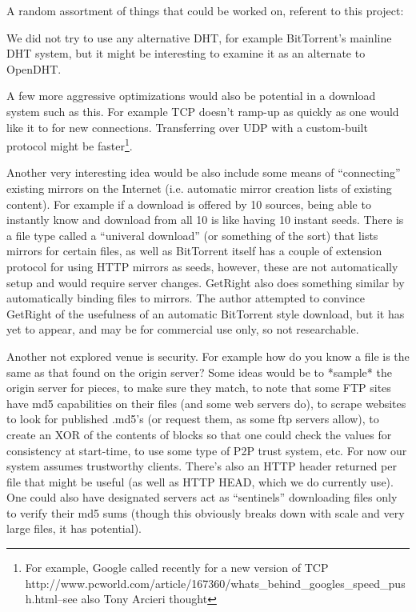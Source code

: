   
A random assortment of things that could be worked on, referent to this project:


We did not try to use any alternative DHT, for example BitTorrent's mainline DHT system, but it might be interesting to examine it as an alternate to OpenDHT.

A few more aggressive optimizations would also be potential in a download system such as this.  For example TCP doesn't ramp-up as quickly as one would like it to for new connections.  Transferring over UDP with a custom-built protocol might be faster\footnote{For example, Google called recently for a new version of TCP http://www.pcworld.com/article/167360/whats\_behind\_googles\_speed\_push.html--see also Tony Arcieri thought}.  

Another very interesting idea would be also include some means of ``connecting'' existing mirrors on the Internet (i.e. automatic mirror creation lists of existing content).  For example if a download is offered by 10 sources, being able to instantly know and download from all 10 is like having 10 instant seeds.  There is a file type called a ``univeral download'' (or something of the sort) that lists mirrors for certain files, as well as BitTorrent itself has a couple of extension protocol for using HTTP mirrors as seeds, however, these are not automatically setup and would require server changes.  GetRight also does something similar by automatically binding files to mirrors.  The author attempted to convince GetRight of the usefulness of an automatic BitTorrent style download, but it has yet to appear, and may be for commercial use only, so not researchable.


Another not explored venue is security.  For example how do you know a file is the same as that found on the origin server?  Some ideas would be to *sample* the origin server for pieces, to make sure they match, to note that some FTP sites have md5 capabilities on their files (and some web servers do), to scrape websites to look for published .md5's (or request them, as some ftp servers allow), to create an XOR of the contents of blocks so that one could check the values for consistency at start-time, to use some type of P2P trust system, etc. For now our system assumes trustworthy clients.  There's also an HTTP header returned per file that might be useful (as well as HTTP HEAD, which we do currently use).  One could also have designated servers act as ``sentinels'' downloading files only to verify their md5 sums (though this obviously breaks down with scale and very large files, it has potential).

